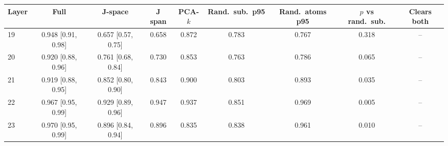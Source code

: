\begin{tabular}{lcccccccc}\toprule
Layer & Full & J-space & J span & PCA-$k$ & Rand.\ sub.\ p95 & Rand.\ atoms p95 & $p$ vs rand.\ sub. & Clears both\\\midrule
19 & 0.948 [0.91, 0.98] & 0.657 [0.57, 0.75] & 0.658 & 0.872 & 0.783 & 0.767 & 0.318 & --\\
20 & 0.920 [0.88, 0.96] & 0.761 [0.68, 0.84] & 0.730 & 0.853 & 0.763 & 0.786 & 0.065 & --\\
21 & 0.919 [0.88, 0.95] & 0.852 [0.80, 0.90] & 0.843 & 0.900 & 0.803 & 0.893 & 0.035 & --\\
22 & 0.967 [0.95, 0.99] & 0.929 [0.89, 0.96] & 0.947 & 0.937 & 0.851 & 0.969 & 0.005 & --\\
23 & 0.970 [0.95, 0.99] & 0.896 [0.84, 0.94] & 0.896 & 0.835 & 0.838 & 0.961 & 0.010 & --\\
\bottomrule\end{tabular}
